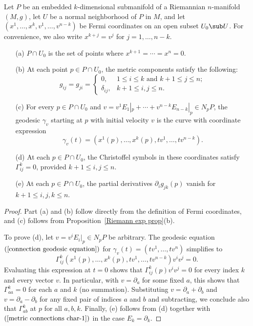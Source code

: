 \begin{proposition}\label{Riemann Fermi coordinate prop}
Let $P$ be an embedded $k$-dimensional submanifold of a Riemannian $n$-manifold $(M,g)$, let $U$ be a normal neighborhood of $P$ in $M$, and let $(x^1,\dots,x^k,v^1,\dots,v^{n-k})$ 
be Fermi coordinates on an open subset $U_0\sub U$. For convenience, we also write $x^{k+j}=v^j$ for $j=1,\dots,n-k$.
\begin{itemize}
\item[(a)] $P\cap U_0$ is the set of points where $x^{k+1}=\cdots=x^n=0$.
\item[(b)] At each point $p\in P\cap U_0$, the metric components satisfy the following:
\[g_{ij}=g_{ji}=\begin{cases}
0,&1\leq i\leq k\text{ and }k+1\leq j\leq n;\\
\delta_{ij},&k+1\leq i,j\leq n.
\end{cases}\]
\item[(c)] For every $p\in P\cap U_0$ and $v=v^1E_1|_p+\cdots+v^{n-k}E_{n-k}|_p\in N_pP$, the geodesic $\gamma_v$ starting at $p$ with initial velocity $v$ is the curve 
with coordinate expression 
\[\gamma_v(t)=(x^1(p),\dots,x^k(p),tv^1,\dots,tv^{n-k}).\]
\item[(d)] At each $p\in P\cap U_0$, the Christoffel symbols in these coordinates satisfy $\Gamma_{ij}^k=0$, provided $k+1\leq i,j\leq n$.
\item[(e)] At each $p\in P\cap U_0$, the partial derivatives $\partial_ig_{jk}(p)$ vanish for $k+1\leq i,j,k\leq n$. 
\end{itemize}
\end{proposition}
\begin{proof}
Part (a) and (b) follow directly from the definition of Fermi coordinates, and (c) follows from Proposition~\ref{Riemann exp prop}(b).\par
To prove (d), let $v=v^iE_i|_p\in N_pP$ be arbitrary. The geodesic equation $(\ref{connection geodesic equation})$ for $\gamma_v(t)=(tv^1,\dots,tv^n)$ simplifies to
\[\Gamma_{ij}^k(x^1(p),\dots,x^k(p),tv^1,\dots,tv^{n-k})v^iv^j=0.\]
Evaluating this expression at $t=0$ shows that $\Gamma_{ij}^k(p)v^iv^j=0$ for every index $k$ and every vector $v$. In particular, with $v=\partial_a$ for some fixed 
$a$, this shows that $\Gamma_{aa}^k=0$ for each $a$ and $k$ (no summation). Substituting $v=\partial_a+\partial_b$ and $v=\partial_a-\partial_b$ for any fixed pair of 
indices $a$ and $b$ and subtracting, we conclude also that $\Gamma_{ab}^k$ at $p$ for all $a,b,k$. Finally, (e) follows from (d) together with 
$(\ref{metric connections char-1})$ in the case $E_k=\partial_k$.
\end{proof}
